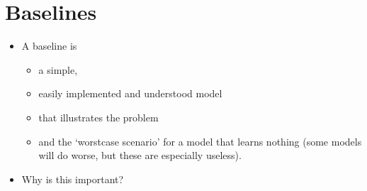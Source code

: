 \documentclass[letterpaper,10pt,english]{sphinxmanual}
\begin{document}
\begin{sphinxVerbatim}[commandchars=\\\{\}]
            
           
            \PYG{p}{[}\PYG{p}{]}     
\end{sphinxVerbatim}

\noindent{}


\chapter{Baselines}
\label{\detokenize{03-Datasets:baselines}}\begin{itemize}
\item {} 
\sphinxAtStartPar
A baseline is
\begin{itemize}
\item {} 
\sphinxAtStartPar
a simple,

\item {} 
\sphinxAtStartPar
easily implemented and understood model

\item {} 
\sphinxAtStartPar
that illustrates the problem

\item {} 
\sphinxAtStartPar
and the ‘worst\sphinxhyphen{}case scenario’ for a model that learns nothing (some models will do worse, but these are especially useless).

\end{itemize}

\item {} 
\sphinxAtStartPar
Why is this important?

\end{itemize}
\end{document}
